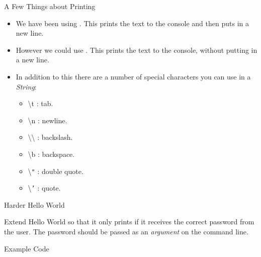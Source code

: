 \begin{frame}{A Few Things about Printing}
\begin{itemize}
\item We have been using \texttt{}. This prints the text to the console and then puts in a new line.
\item However we could use \texttt{}. This prints the text to the console, without putting in a new line. \pause
\item In addition to this there are a number of special characters you can use in a \emph{String}:
\begin{itemize}
\item {\textbackslash}t : tab.
\item {\textbackslash}n : newline.
\item {\textbackslash}{\textbackslash} : backslash.
\item {\textbackslash}b : backspace.
\item {\textbackslash}\texttt{"} : double quote.
\item {\textbackslash}\texttt{'} : quote.
\end{itemize}
\end{itemize}
\end{frame}

\begin{frame}{Harder Hello World}

\begin{center}
Extend Hello World so that it only prints if it receives the correct password from the user. The password should be passed as an \emph{argument} on the command line.
\end{center}
\end{frame}

\begin{frame}[fragile]{Example Code}
\begin{semiverbatim}\end{semiverbatim}

\end{frame}

